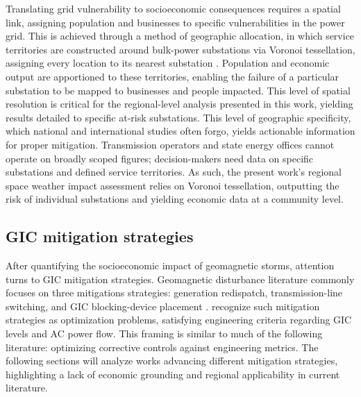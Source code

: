 \documentclass[draft]{agujournal2019}
\begin{document}
Translating grid vulnerability to socioeconomic consequences requires a spatial link, assigning population and businesses to specific vulnerabilities in the power grid. This is achieved through a method of geographic allocation, in which service territories are constructed around bulk-power substations via Voronoi tessellation, assigning every location to its nearest substation \cite{Thacker2017}. Population and economic output are apportioned to these territories, enabling the failure of a particular substation to be mapped to businesses and people impacted. This level of spatial resolution is critical for the regional-level analysis presented in this work, yielding results detailed to specific at-risk substations. This level of geographic specificity, which national and international studies often forgo, yields actionable information for proper mitigation. Transmission operators and state energy offices cannot operate on broadly scoped figures; decision-makers need data on specific substations and defined service territories. As such, the present work's regional space weather impact assessment relies on Voronoi tessellation, outputting the risk of individual substations and yielding economic data at a community level. 

\subsection{GIC mitigation strategies}

After quantifying the socioeconomic impact of geomagnetic storms, attention turns to GIC mitigation strategies. Geomagnetic disturbance literature commonly focuses on three mitigations strategies: generation redispatch, transmission-line switching, and GIC blocking-device placement \cite{Kazerooni2019}.  recognize such mitigation strategies as optimization problems, satisfying engineering criteria regarding GIC levels and AC power flow. This framing is similar to much of the following literature: optimizing corrective controls against engineering metrics. The following sections will analyze works advancing different mitigation strategies, highlighting a lack of economic grounding and regional applicability in current literature. 
\end{document}
